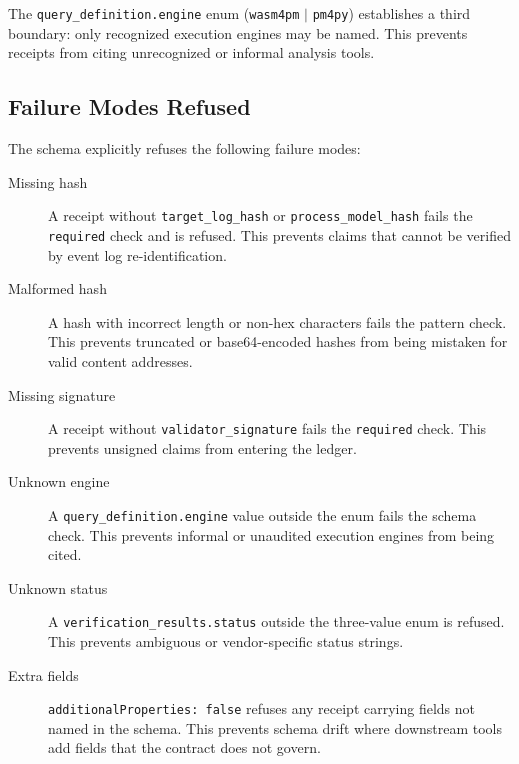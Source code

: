 The \texttt{query\_definition.engine} enum (\texttt{wasm4pm} $|$ \texttt{pm4py}) establishes a
third boundary: only recognized execution engines may be named. This prevents receipts from
citing unrecognized or informal analysis tools.

\subsection{Failure Modes Refused}
\label{sec:schemas-architecture-failure-modes}

The schema explicitly refuses the following failure modes:

\begin{description}
  \item[Missing hash] A receipt without \texttt{target\_log\_hash} or \texttt{process\_model\_hash}
    fails the \texttt{required} check and is refused. This prevents claims that cannot be verified
    by event log re-identification.
  \item[Malformed hash] A hash with incorrect length or non-hex characters fails the pattern check.
    This prevents truncated or base64-encoded hashes from being mistaken for valid content addresses.
  \item[Missing signature] A receipt without \texttt{validator\_signature} fails the \texttt{required}
    check. This prevents unsigned claims from entering the ledger.
  \item[Unknown engine] A \texttt{query\_definition.engine} value outside the enum fails the
    schema check. This prevents informal or unaudited execution engines from being cited.
  \item[Unknown status] A \texttt{verification\_results.status} outside the three-value enum
    is refused. This prevents ambiguous or vendor-specific status strings.
  \item[Extra fields] \texttt{additionalProperties: false} refuses any receipt carrying fields
    not named in the schema. This prevents schema drift where downstream tools add fields that
    the contract does not govern.
\end{description}
